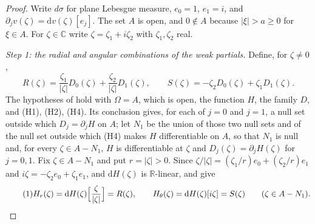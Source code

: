 \begin{proof}
Write $d\sigma$ for plane Lebesgue measure, $e_0=1$, $e_1=i$, and
$\partial_jv(\zeta)=\mathrm{d}v(\zeta)[e_j]$.  The set $A$ is open, and
$0\notin A$ because $|\xi|>a\ge0$ for $\xi\in A$.  For $\zeta\in\mathbb{C}$
write $\zeta=\zeta_1+i\zeta_2$ with $\zeta_1,\zeta_2$ real.

\emph{Step 1: the radial and angular combinations of the weak partials.}
Define, for $\zeta\neq0$,
\[
  R(\zeta)=\frac{\zeta_1}{|\zeta|}D_0(\zeta)+\frac{\zeta_2}{|\zeta|}D_1(\zeta),
  \qquad
  S(\zeta)=-\zeta_2D_0(\zeta)+\zeta_1D_1(\zeta).
\]
The hypotheses of  hold with $\Omega=A$, which
is open, the function $H$, the family $D$, and (H1), (H2), (H4).  Its
conclusion gives, for each of $j=0$ and $j=1$, a null set outside which
$D_j=\partial_jH$ on $A$; let $N_1$ be the union of those two null sets and of
the null set outside which (H4) makes $H$ differentiable on $A$, so that $N_1$
is null and, for every $\zeta\in A-N_1$, $H$ is differentiable at $\zeta$ and
$D_j(\zeta)=\partial_jH(\zeta)$ for $j=0,1$.  Fix
$\zeta\in A-N_1$ and put $r=|\zeta|>0$.  Since
$\zeta/|\zeta|=(\zeta_1/r)e_0+(\zeta_2/r)e_1$ and
$i\zeta=-\zeta_2e_0+\zeta_1e_1$, and $\mathrm{d}H(\zeta)$ is
$\mathbb{R}$-linear,  and  give
\begin{equation}\tag{1}
  H_r(\zeta)=\mathrm{d}H(\zeta)\Bigl[\frac{\zeta}{|\zeta|}\Bigr]=R(\zeta),
  \qquad
  H_\theta(\zeta)=\mathrm{d}H(\zeta)[i\zeta]=S(\zeta)
  \qquad(\zeta\in A-N_1).
\end{equation}


\end{proof}
